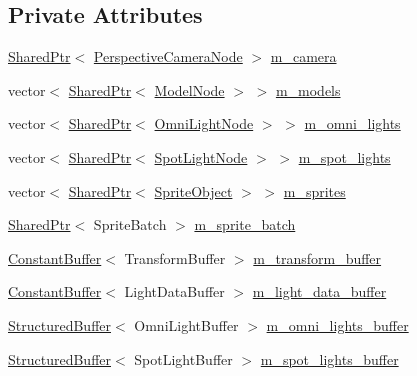 \subsection*{Private Attributes}
\begin{DoxyCompactItemize}
\item 
\hyperlink{namespacemage_a1e01ae66713838a7a67d30e44c67703e}{Shared\+Ptr}$<$ \hyperlink{namespacemage_a4542f24699be53c2f30040ce575155a7}{Perspective\+Camera\+Node} $>$ \hyperlink{classmage_1_1_world_a3c4950e05a425125916345ac95af127d}{m\+\_\+camera}
\item 
vector$<$ \hyperlink{namespacemage_a1e01ae66713838a7a67d30e44c67703e}{Shared\+Ptr}$<$ \hyperlink{namespacemage_a3086b6de2ec7ebd59d8b0bdc57195760}{Model\+Node} $>$ $>$ \hyperlink{classmage_1_1_world_af09ef36bad18a99a9ebf0be59737b561}{m\+\_\+models}
\item 
vector$<$ \hyperlink{namespacemage_a1e01ae66713838a7a67d30e44c67703e}{Shared\+Ptr}$<$ \hyperlink{namespacemage_a5d71843ded3749108547eba2a5ce4d85}{Omni\+Light\+Node} $>$ $>$ \hyperlink{classmage_1_1_world_a3f4164ea7cb5be1873c5b34d237cac0e}{m\+\_\+omni\+\_\+lights}
\item 
vector$<$ \hyperlink{namespacemage_a1e01ae66713838a7a67d30e44c67703e}{Shared\+Ptr}$<$ \hyperlink{namespacemage_ab9f49a82dd438032bb38c5436a657335}{Spot\+Light\+Node} $>$ $>$ \hyperlink{classmage_1_1_world_aafb9aeddf2758f0fe49315a75303a8cf}{m\+\_\+spot\+\_\+lights}
\item 
vector$<$ \hyperlink{namespacemage_a1e01ae66713838a7a67d30e44c67703e}{Shared\+Ptr}$<$ \hyperlink{classmage_1_1_sprite_object}{Sprite\+Object} $>$ $>$ \hyperlink{classmage_1_1_world_a2c769aca9f3394dc0f41473c5cd342a9}{m\+\_\+sprites}
\item 
\hyperlink{namespacemage_a1e01ae66713838a7a67d30e44c67703e}{Shared\+Ptr}$<$ Sprite\+Batch $>$ \hyperlink{classmage_1_1_world_abb5d26cbfbd7b5792a53359b823c9f37}{m\+\_\+sprite\+\_\+batch}
\item 
\hyperlink{structmage_1_1_constant_buffer}{Constant\+Buffer}$<$ Transform\+Buffer $>$ \hyperlink{classmage_1_1_world_a538dbd911642f658266db42005bf157d}{m\+\_\+transform\+\_\+buffer}
\item 
\hyperlink{structmage_1_1_constant_buffer}{Constant\+Buffer}$<$ Light\+Data\+Buffer $>$ \hyperlink{classmage_1_1_world_af6a9ec5ab7482665d4c2e8c908e9c2a9}{m\+\_\+light\+\_\+data\+\_\+buffer}
\item 
\hyperlink{structmage_1_1_structured_buffer}{Structured\+Buffer}$<$ Omni\+Light\+Buffer $>$ \hyperlink{classmage_1_1_world_ade38f71376632c67686d1bfbbc6200ca}{m\+\_\+omni\+\_\+lights\+\_\+buffer}
\item 
\hyperlink{structmage_1_1_structured_buffer}{Structured\+Buffer}$<$ Spot\+Light\+Buffer $>$ \hyperlink{classmage_1_1_world_ae3ac3b5697519beb12ea24ab84d1c9fc}{m\+\_\+spot\+\_\+lights\+\_\+buffer}
\end{DoxyCompactItemize}


